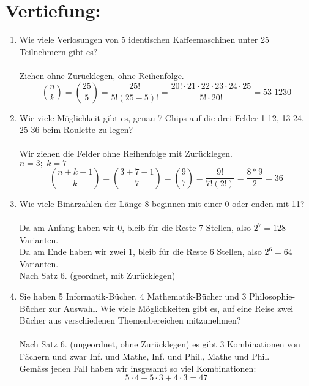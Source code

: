 



    \maketitle
    \section*{Vertiefung:}
    \begin{enumerate}[label=(\alph*)]
        \item  Wie viele Verlosungen von 5 identischen Kaffeemaschinen unter 25 Teilnehmern gibt es?\\\\
        Ziehen ohne Zurücklegen, ohne Reihenfolge.\\    
        $${n \choose k}= {25 \choose 5}= \frac{25!}{5!(25-5)!}= 
        \frac{20!\cdot 21 \cdot 22 \cdot 23 \cdot 24 \cdot 25}{5! \cdot 20!} = 53 \; 1230 $$
        
        \item Wie viele Möglichkeit gibt es, genau 7 Chips auf die drei Felder 1-12, 13-24, 25-36 
        beim Roulette zu legen?\\\\ 
        Wir ziehen die Felder ohne Reihenfolge mit Zur\"ucklegen.\\
        $n=3; \; k=7$ \\
        $$ \binom{n+k-1}{k}= \binom{3+7-1}{7}= \binom{9}{7}=
        \frac{9!}{7!(2!)}= \frac{8*9}{2}=36 $$

        \item Wie viele Binärzahlen der Länge 8 beginnen mit einer 0 oder enden mit 11?\\\\
        Da am Anfang haben wir 0, bleib f\"ur die Reste 7 Stellen, also $2^7 = 128$ Varianten.\\
        Da am Ende haben wir zwei 1, bleib f\"ur die Reste 6 Stellen, also $2^6 = 64$ Varianten.\\
        Nach Satz 6. (geordnet, mit Zur\"ucklegen)

        \item Sie haben 5 Informatik-Bücher, 4 Mathematik-Bücher und 3 Philosophie-Bücher zur
        Auswahl. Wie viele Möglichkeiten gibt es, auf eine Reise zwei Bücher aus verschiedenen
        Themenbereichen mitzunehmen?\\\\
        Nach Satz 6. (ungeordnet, ohne Zur\"ucklegen) es gibt 3 Kombinationen von F\"achern und zwar
        Inf. und Mathe, Inf. und Phil., Mathe und Phil.\\
        Gem\"ass jeden Fall haben wir insgesamt so viel Kombinationen:
        \[5 \cdot 4 + 5 \cdot 3 + 4 \cdot 3 = 47\]


\end{enumerate}
